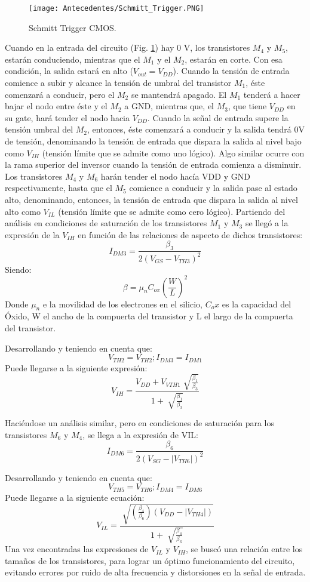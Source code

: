 \begin{figure}[H]
\centering
\texttt{[image: Antecedentes/Schmitt\_Trigger.PNG]}
\caption{Schmitt Trigger CMOS.}
\label{fig:Schmit}
\end{figure}

Cuando en la entrada del circuito (Fig. \ref{fig:Schmit}) hay
0 V, los transistores $M_4$ y $M_5$, estarán conduciendo,
mientras que el $M_1$ y el $M_2$, estarán en
corte. Con esa condición, la salida estará en alto
($V_{out} = V_{DD}$). Cuando la tensión de entrada comience
a subir y alcance la tensión de umbral
del transistor $M_1$, éste comenzará a conducir,
pero el $M_2$ se mantendrá apagado. El $M_1$ tenderá
a hacer bajar el nodo entre éste y el $M_2$ a
GND, mientras que, el $M_3$, que tiene $V_{DD}$ en su
gate, hará tender el nodo hacia $V_{DD}$. Cuando la
señal de entrada supere la tensión umbral del
$M_2$, entonces, éste comenzará a conducir y la
salida tendrá 0V de tensión, denominando la
tensión de entrada que dispara la salida al nivel
bajo como $V_{IH}$ (tensión límite que se admite
como uno lógico).
Algo similar ocurre con la rama superior del inversor
cuando la tensión de entrada comienza a
disminuir. Los transistores $M_4$ y $M_6$ harán tender
el nodo hacía VDD y GND respectivamente,
hasta que el $M_5$ comience a conducir y la salida
pase al estado alto, denominando, entonces, la
tensión de entrada que dispara la salida al nivel
alto como $V_{IL}$ (tensión límite que se admite
como cero lógico).
Partiendo del análisis en condiciones de saturación
de los transistores $M_1$ y $M_3$ se llegó a la
expresión de la $V_{IH}$ en función de las relaciones
de aspecto de dichos transistores:
$$I_{DM3} = \frac{\beta _3}{2(V_{GS}-V_{TH3})^2}$$
Siendo:
$$\beta = \mu _n C_{ox} (\frac{W}{L})^2 $$
Donde $\mu _n$ e la movilidad de los electrones en el silicio, $C_ox$ es la capacidad del Óxido, W el ancho de la compuerta
del transistor y L el largo de la compuerta del transistor.

Desarrollando y teniendo en cuenta que:
$$V_{TH2} = V_{TH2};  I_{DM3} = I_{DM1}$$
Puede llegarse a la siguiente expresión:
$$V_{IH}= \frac{V_{DD}+V_{VTH1}\sqrt[]{\frac{\beta _1}{\beta _3}}}{1+\sqrt[]{\frac{\beta _1}{\beta _3}}}$$

Haciéndose un análisis similar, pero en condiciones
de saturación para los transistores $M_6$ y $M_4$, se
llega a la expresión de VIL:
$$I_{DM6} = \frac{\beta _6}{2(V_{SG}-|V_{TH6}|)^2}$$

Desarrollando y teniendo en cuenta que:
$$V_{TH5} = V_{TH6};  I_{DM4} = I_{DM6}$$
Puede llegarse a la siguiente ecuación:
$$V_{IL}= \frac{\sqrt[]{(\frac{\beta _4}{\beta _6})(V_{DD}-|V_{TH4}|)}}{1+\sqrt[]{\frac{\beta _4}{\beta _6}}}$$
Una vez encontradas las expresiones de $V_{IL}$ y
$V_{IH}$, se buscó una relación entre los tamaños de
los transistores, para lograr un óptimo funcionamiento
del circuito, evitando errores por ruido
de alta frecuencia y distorsiones en la señal de
entrada.

